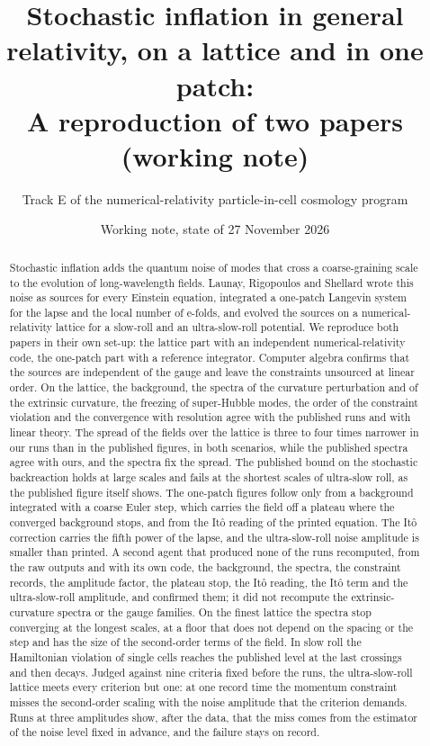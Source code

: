 \documentclass[aps,prd,twocolumn,10pt,superscriptaddress,nofootinbib,longbibliography,floatfix]{revtex4-2}
\begin{document}
\raggedbottom

\title{Stochastic inflation in general relativity, on a lattice and in one patch:\\ A reproduction of two papers (working note)}

\author{Track E of the numerical-relativity particle-in-cell cosmology program}

\date{Working note, state of 27 November 2026}

\begin{abstract}
Stochastic inflation adds the quantum noise of modes that cross a coarse-graining scale to the evolution of long-wavelength fields. Launay, Rigopoulos and Shellard wrote this noise as sources for every Einstein equation, integrated a one-patch Langevin system for the lapse and the local number of e-folds, and evolved the sources on a numerical-relativity lattice for a slow-roll and an ultra-slow-roll potential. We reproduce both papers in their own set-up: the lattice part with an independent numerical-relativity code, the one-patch part with a reference integrator. Computer algebra confirms that the sources are independent of the gauge and leave the constraints unsourced at linear order. On the lattice, the background, the spectra of the curvature perturbation and of the extrinsic curvature, the freezing of super-Hubble modes, the order of the constraint violation and the convergence with resolution agree with the published runs and with linear theory. The spread of the fields over the lattice is three to four times narrower in our runs than in the published figures, in both scenarios, while the published spectra agree with ours, and the spectra fix the spread. The published bound on the stochastic backreaction holds at large scales and fails at the shortest scales of ultra-slow roll, as the published figure itself shows. The one-patch figures follow only from a background integrated with a coarse Euler step, which carries the field off a plateau where the converged background stops, and from the It\^o reading of the printed equation. The It\^o correction carries the fifth power of the lapse, and the ultra-slow-roll noise amplitude is smaller than printed. A second agent that produced none of the runs recomputed, from the raw outputs and with its own code, the background, the spectra, the constraint records, the amplitude factor, the plateau stop, the It\^o reading, the It\^o term and the ultra-slow-roll amplitude, and confirmed them; it did not recompute the extrinsic-curvature spectra or the gauge families. On the finest lattice the spectra stop converging at the longest scales, at a floor that does not depend on the spacing or the step and has the size of the second-order terms of the field. In slow roll the Hamiltonian violation of single cells reaches the published level at the last crossings and then decays. Judged against nine criteria fixed before the runs, the ultra-slow-roll lattice meets every criterion but one: at one record time the momentum constraint misses the second-order scaling with the noise amplitude that the criterion demands. Runs at three amplitudes show, after the data, that the miss comes from the estimator of the noise level fixed in advance, and the failure stays on record.
\end{abstract}
\end{document}
